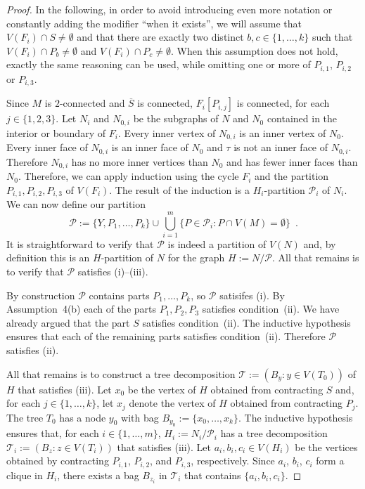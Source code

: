 \documentclass{patmorin}
\theoremstyle{plain}
\theoremstyle{definition}
\begin{document}
\begin{proof}
	In the following, in order to avoid introducing even more notation or constantly adding the modifier ``when it exists'', we will assume that $V(F_i)\cap S\neq\emptyset$ and that there are exactly two distinct $b,c\in\{1,\ldots,k\}$ such that $V(F_i)\cap P_b\neq\emptyset$ and $V(F_i)\cap P_c\neq\emptyset$.  When this assumption does not hold, exactly the same reasoning can be used, while omitting one or more of $P_{i,1}$, $P_{i,2}$ or $P_{i,3}$.

	Since $M$ is $2$-connected and $\overline{S}$ is connected, $F_i[P_{i,j}]$ is connected, for each $j\in\{1,2,3\}$.  Let $N_i$ and $N_{0,i}$ be the subgraphs of $N$ and $N_0$ contained in the interior or boundary of $F_i$.  Every inner vertex of $N_{0,i}$ is an inner vertex of $N_{0}$.  Every inner face of $N_{0,i}$ is an inner face of $N_0$ and $\tau$ is not an inner face of $N_{0,i}$.  Therefore $N_{0,i}$ has no more inner vertices than $N_0$ and has fewer inner faces than $N_{0}$.  Therefore, we can apply induction using the cycle $F_i$ and the partition $P_{i,1},P_{i,2},P_{i,3}$ of $V(F_i)$.  The result of the induction is a $H_i$-partition $\mathcal{P}_i$ of $N_i$.
	We can now define our partition
	\[
	\mathcal{P}:=\{Y, P_1,\ldots,P_k\} \cup \bigcup_{i=1}^m \{P\in\mathcal{P}_i: P\cap V(M)=\emptyset\} \enspace .
	\]
	It is straightforward to verify that $\mathcal{P}$ is indeed a partition of $V(N)$ and, by definition this is an $H$-partition of $N$ for the graph $H:=N/\mathcal{P}$.  All that remains is to verify that $\mathcal{P}$ satisfies (i)--(iii).

	By construction $\mathcal{P}$ contains parts $P_1,\ldots,P_k$, so $\mathcal{P}$ satisifes (i).  By Assumption~4(b) each of the parts $P_1,P_2,P_3$ satisfies condition~(ii).  We have already argued that the part $S$ satisfies condition~(ii).  The inductive hypothesis ensures that each of the remaining parts satisfies condition~(ii).   Therefore $\mathcal{P}$ satisfies (ii).

	All that remains is to construct a tree decomposition $\mathcal{T}:=(B_y:y\in V(T_0))$ of $H$ that satisfies (iii). Let $x_0$ be the vertex of $H$ obtained from contracting $S$ and, for each $j\in\{1,\ldots,k\}$, let $x_j$ denote the vertex of $H$ obtained from contracting $P_j$.  The tree $T_0$ has a node $y_0$ with bag $B_{y_0}:=\{x_0,\ldots,x_k\}$. The inductive hypothesis ensures that, for each $i\in\{1,\ldots,m\}$,  $H_i:=N_i/\mathcal{P}_i$ has a tree decomposition $\mathcal{T}_i:=(B_z:z\in V(T_i))$ that satisfies (iii).  Let $a_i,b_i,c_i\in V(H_i)$ be the vertices obtained by contracting $P_{i,1}$, $P_{i,2}$, and $P_{i,3}$, respectively. Since $a_i$, $b_i$, $c_i$ form a clique in $H_i$, there exists a bag $B_{z_i}$ in $\mathcal{T}_i$ that contains $\{a_i,b_i,c_i\}$.


\end{proof}
\end{document}

